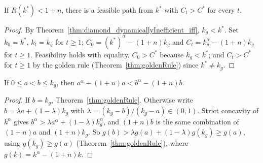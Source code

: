 \begin{theorem}
\label{thm:diamond_exists_dominating_path}
\leanok
{}
If $R(k^*) < 1 + n$, there is a feasible path from $k^*$ with $C_t > C^*$ for every $t$.
\end{theorem}
\begin{proof}
\leanok
By Theorem~\ref{thm:diamond_dynamicallyInefficient_iff}, $k_g < k^*$. Set $k_0 = k^*$, $k_t = k_g$ for $t \ge 1$;
$C_0 = (k^*)^\alpha - (1+n)k_g$ and $C_t = k_g^\alpha - (1+n)k_g$ for $t \ge 1$. Feasibility holds with equality.
$C_0 > C^*$ because $k_g < k^*$; and $C_t > C^*$ for $t \ge 1$ by the golden rule
(Theorem~\ref{thm:goldenRule}) since $k^* \neq k_g$.
\end{proof}

\begin{lemma}
\label{lem:diamond_consumption_strictMono}
\leanok
{}
If $0 \le a < b \le k_g$, then $a^\alpha - (1+n)a < b^\alpha - (1+n)b$.
\end{lemma}
\begin{proof}
\leanok
If $b = k_g$, Theorem~\ref{thm:goldenRule}. Otherwise write $b = \lambda a + (1-\lambda)k_g$ with
$\lambda = (k_g - b)/(k_g - a) \in (0, 1)$. Strict concavity of $k^\alpha$ gives
$b^\alpha > \lambda a^\alpha + (1-\lambda)k_g^\alpha$, and $(1+n)b$ is the same combination of $(1+n)a$ and
$(1+n)k_g$. So $g(b) > \lambda g(a) + (1-\lambda) g(k_g) \ge g(a)$, using $g(k_g) \ge g(a)$
(Theorem~\ref{thm:goldenRule}), where $g(k) = k^\alpha - (1+n)k$.
\end{proof}

